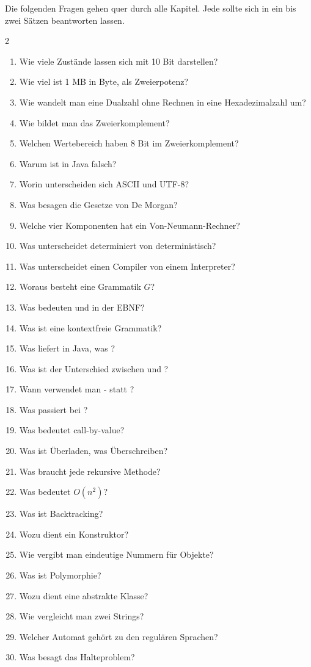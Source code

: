 Die folgenden Fragen gehen quer durch alle Kapitel. Jede sollte sich in ein bis zwei Sätzen beantworten lassen.
\begin{multicols}{2}
\begin{enumerate}[itemsep=0.2em]
\item Wie viele Zustände lassen sich mit 10 Bit darstellen?
\item Wie viel ist 1 MB in Byte, als Zweierpotenz?
\item Wie wandelt man eine Dualzahl ohne Rechnen in eine Hexadezimalzahl um?
\item Wie bildet man das Zweierkomplement?
\item Welchen Wertebereich haben 8 Bit im Zweierkomplement?
\item Warum ist  in Java falsch?
\item Worin unterscheiden sich ASCII und UTF-8?
\item Was besagen die Gesetze von De Morgan?
\item Welche vier Komponenten hat ein Von-Neumann-Rechner?
\item Was unterscheidet determiniert von deterministisch?
\item Was unterscheidet einen Compiler von einem Interpreter?
\item Woraus besteht eine Grammatik $G$?
\item Was bedeuten \code{[ ]} und \code{\{ \}} in der EBNF?
\item Was ist eine kontextfreie Grammatik?
\item Was liefert  in Java, was ?
\item Was ist der Unterschied zwischen  und ?
\item Wann verwendet man - statt ?
\item Was passiert bei ?
\item Was bedeutet call-by-value?
\item Was ist Überladen, was Überschreiben?
\item Was braucht jede rekursive Methode?
\item Was bedeutet $O(n^2)$?
\item Was ist Backtracking?
\item Wozu dient ein Konstruktor?
\item Wie vergibt man eindeutige Nummern für Objekte?
\item Was ist Polymorphie?
\item Wozu dient eine abstrakte Klasse?
\item Wie vergleicht man zwei Strings?
\item Welcher Automat gehört zu den regulären Sprachen?
\item Was besagt das Halteproblem?
\end{enumerate}
\end{multicols}
